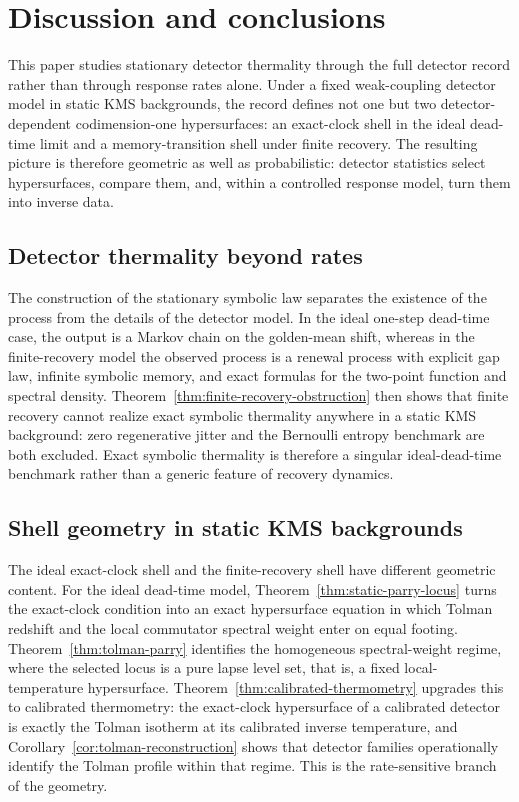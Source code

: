 \section{Discussion and conclusions}\label{sec:bridge:discussion}

This paper studies stationary detector thermality through the full detector record rather than through response rates alone. Under a fixed weak-coupling detector model in static KMS backgrounds, the record defines not one but two detector-dependent codimension-one hypersurfaces: an exact-clock shell in the ideal dead-time limit and a memory-transition shell under finite recovery. The resulting picture is therefore geometric as well as probabilistic: detector statistics select hypersurfaces, compare them, and, within a controlled response model, turn them into inverse data.

\subsection{Detector thermality beyond rates}

The construction of the stationary symbolic law separates the existence of the process from the details of the detector model. In the ideal one-step dead-time case, the output is a Markov chain on the golden-mean shift, whereas in the finite-recovery model the observed process is a renewal process with explicit gap law, infinite symbolic memory, and exact formulas for the two-point function and spectral density. Theorem~\ref{thm:finite-recovery-obstruction} then shows that finite recovery cannot realize exact symbolic thermality anywhere in a static KMS background: zero regenerative jitter and the Bernoulli entropy benchmark are both excluded. Exact symbolic thermality is therefore a singular ideal-dead-time benchmark rather than a generic feature of recovery dynamics.

\subsection{Shell geometry in static KMS backgrounds}

The ideal exact-clock shell and the finite-recovery shell have different geometric content. For the ideal dead-time model, Theorem~\ref{thm:static-parry-locus} turns the exact-clock condition into an exact hypersurface equation in which Tolman redshift and the local commutator spectral weight enter on equal footing. Theorem~\ref{thm:tolman-parry} identifies the homogeneous spectral-weight regime, where the selected locus is a pure lapse level set, that is, a fixed local-temperature hypersurface. Theorem~\ref{thm:calibrated-thermometry} upgrades this to calibrated thermometry: the exact-clock hypersurface of a calibrated detector is exactly the Tolman isotherm at its calibrated inverse temperature, and Corollary~\ref{cor:tolman-reconstruction} shows that detector families operationally identify the Tolman profile within that regime. This is the rate-sensitive branch of the geometry.

